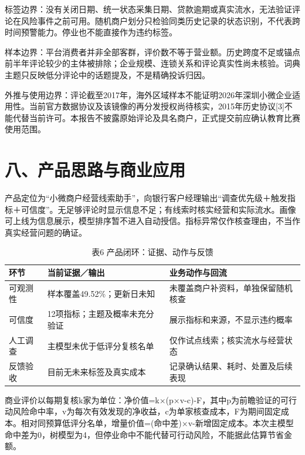\documentclass[a4paper,10pt]{article}
\newlength{\tablewidth}
\begin{document}
标签边界：没有关闭日期、统一状态采集日期、贷款逾期或真实流水，无法验证评论在风险事件之前可用。随机商户划分只检验同类历史记录的状态识别，不代表跨时间预警能力。停业也不能直接作为违约标签。

样本边界：平台消费者并非全部客群，评价数不等于营业额。历史跨度不足或锚点前半年评论较少的主体被排除；企业规模、连锁关系和评论真实性尚未核验。词典主题只反映低分评论中的话题提及，不是精确投诉归因。

外推与使用边界：评论截至2017年，海外区域样本不能证明2026年深圳小微企业适用性。当前官方数据协议及该镜像的再分发授权尚待核实，2015年历史协议[3]不能代替当前许可。本报告不披露原始评论及具名商户，正式提交前应确认教育比赛使用范围。


\newpage
\section*{八、产品思路与商业应用}
产品定位为“小微商户经营线索助手”，向银行客户经理输出“调查优先级＋触发指标＋可信度”。无足够评论时显示信息不足；有线索时核实经营和实际流水。画像可上线为信息展示，模型排序暂不进入自动授信。指标异常仅作核查理由，不当作真实经营问题的确证。

\begin{table}[H]
\centering
\caption{表6 产品闭环：证据、动作与反馈}
\setlength{\tablewidth}{\linewidth}
\addtolength{\tablewidth}{-6\tabcolsep}
\begin{tabular}{>{\raggedright\arraybackslash}p{0.220\tablewidth}>{\raggedright\arraybackslash}p{0.350\tablewidth}>{\raggedright\arraybackslash}p{0.430\tablewidth}}
\toprule
\textbf{环节} & \textbf{当前证据／输出} & \textbf{业务动作与回流} \\
\midrule
可观测性 & 样本覆盖49.52\%；更新日未知 & 未覆盖商户补资料，单独保留随机核查 \\
可信度 & 12项指标；主题及概率未充分验证 & 展示指标和来源，不显示违约概率 \\
人工调查 & 主模型未优于低评分复核名单 & 仅作试点线索；核实流水与经营状态 \\
反馈验收 & 目前无未来标签及真实成本 & 记录确认结果、耗时、处置及后续表现 \\
\bottomrule
\end{tabular}
\end{table}
商业评价以每期复核k家为单位：净价值=k×(p×v-c)-F，其中p为前瞻验证的可行动风险命中率，v为每次有效发现的净收益，c为单家核查成本，F为期间固定成本。相对同预算低评分名单，增量价值=(命中差)×v-新增固定成本。本次主模型命中差为0，树模型为4，但停业命中不能代替可行动风险，不能据此估算节省金额。
\end{document}
